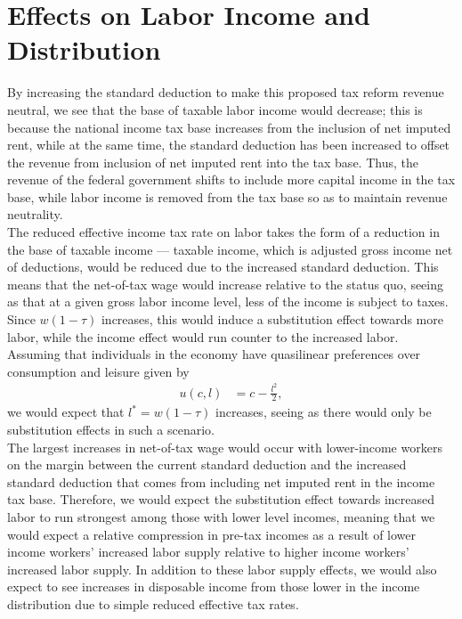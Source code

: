 \documentclass[12pt]{extarticle}
\begin{document}
  \section*{Effects on Labor Income and Distribution}%
  By increasing the standard deduction to make this proposed tax reform revenue neutral, we see that the base of taxable labor income would decrease; this is because the national income tax base increases from the inclusion of net imputed rent, while at the same time, the standard deduction has been increased to offset the revenue from inclusion of net imputed rent into the tax base. Thus, the revenue of the federal government shifts to include more capital income in the tax base, while labor income is removed from the tax base so as to maintain revenue neutrality.\\

  The reduced effective income tax rate on labor takes the form of a reduction in the base of taxable income --- taxable income, which is adjusted gross income net of deductions, would be reduced due to the increased standard deduction. This means that the net-of-tax wage would increase relative to the status quo, seeing as that at a given gross labor income level, less of the income is subject to taxes. Since $w(1-\tau)$ increases, this would induce a substitution effect towards more labor, while the income effect would run counter to the increased labor.\\

  Assuming that individuals in the economy have quasilinear preferences over consumption and leisure given by
  \begin{align*}
    u(c,l) &= c - \frac{l^2}{2},
  \end{align*}
  we would expect that $l^{\ast} = w(1-\tau)$ increases, seeing as there would only be substitution effects in such a scenario.\\

  The largest increases in net-of-tax wage would occur with lower-income workers on the margin between the current standard deduction and the increased standard deduction that comes from including net imputed rent in the income tax base. Therefore, we would expect the substitution effect towards increased labor to run strongest among those with lower level incomes, meaning that we would expect a relative compression in pre-tax incomes as a result of lower income workers' increased labor supply relative to higher income workers' increased labor supply. In addition to these labor supply effects, we would also expect to see increases in disposable income from those lower in the income distribution due to simple reduced effective tax rates.\\
\end{document}
